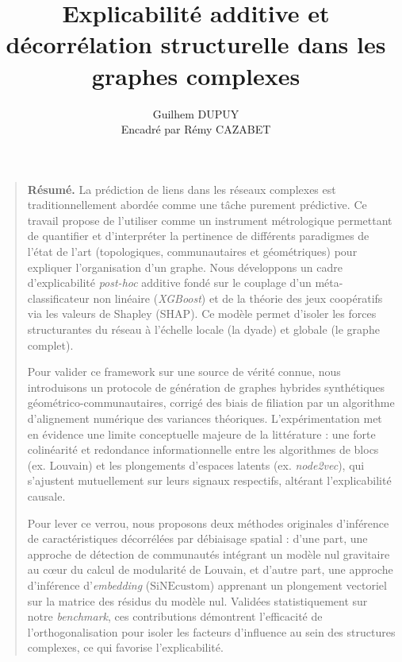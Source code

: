 \documentclass[runningheads]{llncs}
\begin{document}
\title{Explicabilité additive et décorrélation structurelle dans les graphes complexes}

\author{Guilhem DUPUY \\Encadré par Rémy CAZABET}

%
\maketitle              %

\addvspace{1.5em}
\begin{quotation}
\begin{small}
\noindent \textbf{Résumé.} La prédiction de liens dans les réseaux complexes est traditionnellement abordée comme une tâche purement prédictive. Ce travail propose de l'utiliser comme un instrument métrologique permettant de quantifier et d'interpréter la pertinence de différents paradigmes de l'état de l'art (topologiques, communautaires et géométriques) pour expliquer l'organisation d'un graphe. Nous développons un cadre d'explicabilité \textit{post-hoc} additive fondé sur le couplage d'un méta-classificateur non linéaire (\textit{XGBoost}) et de la théorie des jeux coopératifs via les valeurs de Shapley (SHAP). Ce modèle permet d'isoler les forces structurantes du réseau à l'échelle locale (la dyade) et globale (le graphe complet). 

Pour valider ce framework sur une source de vérité connue, nous introduisons un protocole de génération de graphes hybrides synthétiques géométrico-communautaires, corrigé des biais de filiation par un algorithme d'alignement numérique des variances théoriques. L'expérimentation met en évidence une limite conceptuelle majeure de la littérature : une forte colinéarité et redondance informationnelle entre les algorithmes de blocs (ex. Louvain) et les plongements d'espaces latents (ex. \textit{node2vec}), qui s'ajustent mutuellement sur leurs signaux respectifs, altérant l'explicabilité causale. 

Pour lever ce verrou, nous proposons deux méthodes originales d'inférence de caractéristiques décorrélées par débiaisage spatial : d'une part, une approche de détection de communautés intégrant un modèle nul gravitaire au cœur du calcul de modularité de Louvain, et d'autre part, une approche d'inférence d'\textit{embedding} ($\text{SiNEcustom}$) apprenant un plongement vectoriel sur la matrice des résidus du modèle nul. Validées statistiquement sur notre \textit{benchmark}, ces contributions démontrent l'efficacité de l'orthogonalisation pour isoler les facteurs d'influence au sein des structures complexes, ce qui favorise l'explicabilité.


\end{small}
\end{quotation}
\end{document}
